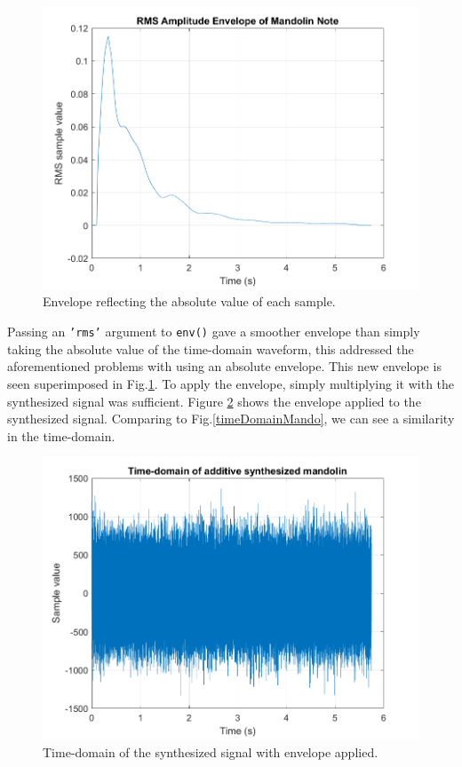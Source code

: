 \documentclass{article}
\begin{document}
            \begin{figure}[h]
                \includegraphics[scale=0.5]{images/envMando.png}%
                \centering
                \caption{Envelope reflecting the absolute value of each sample.}
                \label{envMando}
            \end{figure}
            Passing an \texttt{'rms'} argument to \texttt{env()} gave a smoother envelope than simply taking the absolute value of the time-domain waveform, this addressed the aforementioned problems with using an absolute envelope.
            This new envelope is seen superimposed in Fig.\ref{envMando}.
            To apply the envelope, simply multiplying it with the synthesized signal was sufficient.
            Figure \ref{additiveEnv} shows the envelope applied to the synthesized signal.
            Comparing to Fig.\ref{timeDomainMando}, we can see a similarity in the time-domain.
            \begin{figure}[h]
                \includegraphics[scale=0.5]{images/additiveEnv.png}%
                \centering
                \caption{Time-domain of the synthesized signal with envelope applied.}
                \label{additiveEnv}
            \end{figure}
\end{document}
